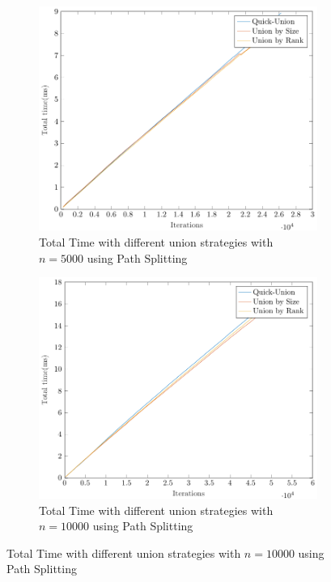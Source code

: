 \begin{figure}[ht]
\begin{subfigure}{0.32\textwidth}
    \end{subfigure}%
    \hfill
    \begin{subfigure}{0.32\textwidth}
        \centering
        \includegraphics[width=\textwidth]{../images/plotPSFull5000_time(ms).pdf}
        \caption{Total Time with different union strategies with $n = 5000$ using Path Splitting}
    \end{subfigure}%
    \hfill
    \begin{subfigure}{0.32\textwidth}
        \centering
        \includegraphics[width=\textwidth]{../images/plotPSFull10000_time(ms).pdf}
        \caption{Total Time with different union strategies with $n = 10000$ using Path Splitting}
    \end{subfigure}


\end{figure}
